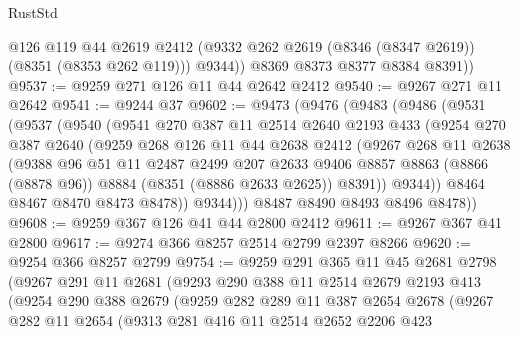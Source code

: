 \begin{lexlean}{RustStd}
\begin{coremodule}
            @126
            @119
            @44
            @2619
            @2412
            (@9332 @262 @2619 (@8346 (@8347 @2619)) (@8351 (@8353 @262 @119)))
            @9344))
        @8369
        @8373
        @8377
        @8384
        @8391))
@9537 := @9259 @271 @126 @11 @44 @2642 @2412
@9540 := @9267 @271 @11 @2642
@9541 := @9244 @37
@9602 := @9473
    (@9476
      (@9483
        (@9486
          (@9531
            (@9537
              (@9540
                (@9541
                  @270
                  @387
                  @11
                  @2514
                  @2640
                  @2193
                  @433
                  (@9254
                    @270
                    @387
                    @2640
                    (@9259
                      @268
                      @126
                      @11
                      @44
                      @2638
                      @2412
                      (@9267
                        @268
                        @11
                        @2638
                        (@9388
                          @96
                          @51
                          @11
                          @2487
                          @2499
                          @207
                          @2633
                          @9406
                          @8857
                          @8863
                          (@8866 (@8878 @96))
                          @8884
                          (@8351 (@8886 @2633 @2625))
                          @8391))
                      @9344))
                  @8464
                  @8467
                  @8470
                  @8473
                  @8478))
              @9344)))
        @8487
        @8490
        @8493
        @8496
        @8478))
@9608 := @9259 @367 @126 @41 @44 @2800 @2412
@9611 := @9267 @367 @41 @2800
@9617 := @9274 @366 @8257 @2514 @2799 @2397 @8266
@9620 := @9254 @366 @8257 @2799
@9754 := @9259
    @291
    @365
    @11
    @45
    @2681
    @2798
    (@9267
      @291
      @11
      @2681
      (@9293
        @290
        @388
        @11
        @2514
        @2679
        @2193
        @413
        (@9254
          @290
          @388
          @2679
          (@9259
            @282
            @289
            @11
            @387
            @2654
            @2678
            (@9267
              @282
              @11
              @2654
              (@9313
                @281
                @416
                @11
                @2514
                @2652
                @2206
                @423

\end{coremodule}
\end{lexlean}
